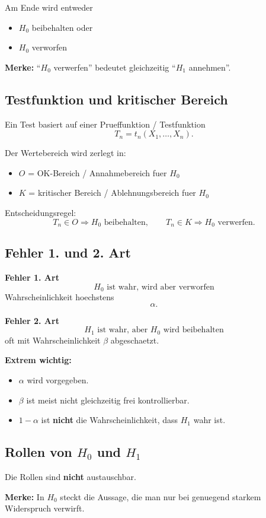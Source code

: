 \documentclass[a4paper,11pt]{article}
\begin{document}
Am Ende wird entweder
\begin{itemize}
  \item $H_0$ beibehalten oder
  \item $H_0$ verworfen
\end{itemize}

\textbf{Merke:}
``$H_0$ verwerfen'' bedeutet gleichzeitig ``$H_1$ annehmen''.

\subsection{Testfunktion und kritischer Bereich}
Ein Test basiert auf einer Prueffunktion / Testfunktion
\[
T_n=t_n(X_1,\dots,X_n).
\]

Der Wertebereich wird zerlegt in:
\begin{itemize}
  \item $O$ = OK-Bereich / Annahmebereich fuer $H_0$
  \item $K$ = kritischer Bereich / Ablehnungsbereich fuer $H_0$
\end{itemize}

Entscheidungsregel:
\[
T_n\in O \Rightarrow H_0 \text{ beibehalten},\qquad
T_n\in K \Rightarrow H_0 \text{ verwerfen}.
\]

\subsection{Fehler 1. und 2. Art}
\textbf{Fehler 1. Art}
\[
H_0 \text{ ist wahr, wird aber verworfen}
\]
Wahrscheinlichkeit hoechstens
\[
\alpha.
\]

\textbf{Fehler 2. Art}
\[
H_1 \text{ ist wahr, aber } H_0 \text{ wird beibehalten}
\]
oft mit Wahrscheinlichkeit $\beta$ abgeschaetzt.

\textbf{Extrem wichtig:}
\begin{itemize}
  \item $\alpha$ wird vorgegeben.
  \item $\beta$ ist meist nicht gleichzeitig frei kontrollierbar.
  \item $1-\alpha$ ist \textbf{nicht} die Wahrscheinlichkeit, dass $H_1$ wahr ist.
\end{itemize}

\subsection{Rollen von $H_0$ und $H_1$}
Die Rollen sind \textbf{nicht} austauschbar.

\textbf{Merke:}
In $H_0$ steckt die Aussage, die man nur bei genuegend starkem Widerspruch verwirft.
\end{document}
